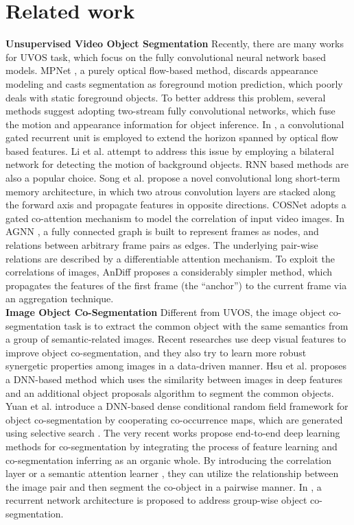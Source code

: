 \documentclass[runningheads]{llncs}
\begin{document}
\section{Related work}
\indent \textbf{Unsupervised Video Object Segmentation}
Recently, there are many works for UVOS task, which  focus on the fully convolutional neural network based  models.  MPNet \cite{vos_motion_pattern}, a purely optical flow-based method,  discards appearance modeling and casts segmentation as foreground motion prediction, which poorly deals with static foreground objects.  To better address this problem, several methods \cite{vos_vis_memory,segflow,motadapt,mbn} suggest adopting two-stream fully convolutional networks, which fuse the motion and appearance information for object inference. In \cite{vos_vis_memory},  a convolutional gated recurrent unit is employed to extend the horizon spanned by optical flow based features. Li et al. \cite{mbn} attempt to address this issue by employing a bilateral network for detecting the motion of background objects. RNN based methods are also a popular choice.  Song et al. \cite{vos_pdb} propose a novel convolutional long short-term memory \cite{lstm} architecture, in which two atrous convolution \cite{deeplabv3} layers are stacked along the forward axis and propagate features in opposite directions. COSNet \cite{vos_cosnet} adopts a gated co-attention mechanism to model the correlation of input video images.  In AGNN \cite{vos_agnn}, a fully connected graph is built to represent frames as nodes, and relations between arbitrary frame pairs as edges. The underlying pair-wise relations are described by a differentiable attention mechanism.   To exploit the correlations of images,  AnDiff \cite{vos_andiff} proposes a considerably simpler method, which propagates the features of the first frame (the “anchor”) to the current frame via an aggregation technique.\\
\noindent \textbf{Image Object Co-Segmentation} Different from UVOS, the image object co-segmentation task is to extract the common object with the same semantics from a group of semantic-related images.
Recent researches \cite{coseg_hsu18,coseg_crf} use deep visual features to improve object co-segmentation, and they also try to learn more robust synergetic properties among images in a data-driven manner.   Hsu et al. \cite{coseg_hsu18} proposes a DNN-based method which uses the similarity between images in deep features and an additional object proposals algorithm \cite{coseg_proposal} to segment the common objects.  Yuan et al. \cite{coseg_crf} introduce a DNN-based dense conditional random field framework for object co-segmentation by cooperating co-occurrence maps, which are generated using selective search \cite{coseg_selectivesearch}. The very recent works \cite{coseg_semaware,coseg_deepcoseg}  propose end-to-end deep learning methods for co-segmentation by integrating the process of feature learning and co-segmentation inferring as an organic whole. By introducing the correlation layer \cite{coseg_deepcoseg} or a semantic attention learner \cite{coseg_semaware}, they can utilize the relationship between the image pair and then segment the co-object in a pairwise manner. In \cite{coseg_li19}, a recurrent network architecture is proposed to address group-wise object co-segmentation. 
\end{document}
